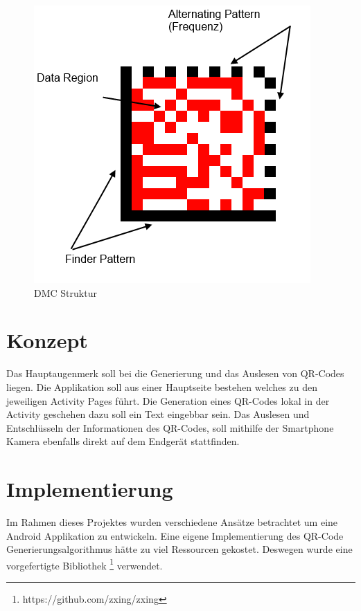 \documentclass[12pt,					%
							 oneside,			%
							 a4paper,			%
							 halfparskip,		%
							 liststotoc,			%
							 bibtotoc,			%
							 fleqn,				%
							 pointlessnumbers]	%
							 {scrreprt}
\begin{document}
\begin{figure}[ht]
\centering   
	 \includegraphics[scale=0.5]{pictures/dmc} 
 	\caption{DMC Struktur}
\end{figure}
\chapter{Konzept}
Das Hauptaugenmerk soll bei die Generierung und das Auslesen von QR-Codes liegen. Die Applikation soll aus einer Hauptseite bestehen welches zu den jeweiligen Activity Pages führt. Die Generation eines QR-Codes lokal in der Activity geschehen dazu soll ein Text eingebbar sein. Das Auslesen und Entschlüsseln der Informationen des QR-Codes, soll mithilfe der Smartphone Kamera ebenfalls direkt auf dem Endgerät stattfinden.
\chapter{Implementierung}	
Im Rahmen dieses Projektes wurden verschiedene Ansätze betrachtet um eine Android Applikation zu entwickeln. Eine eigene Implementierung des QR-Code Generierungsalgorithmus hätte zu viel Ressourcen gekostet. Deswegen wurde eine vorgefertigte Bibliothek \footnote{https://github.com/zxing/zxing} verwendet. 
\end{document}
